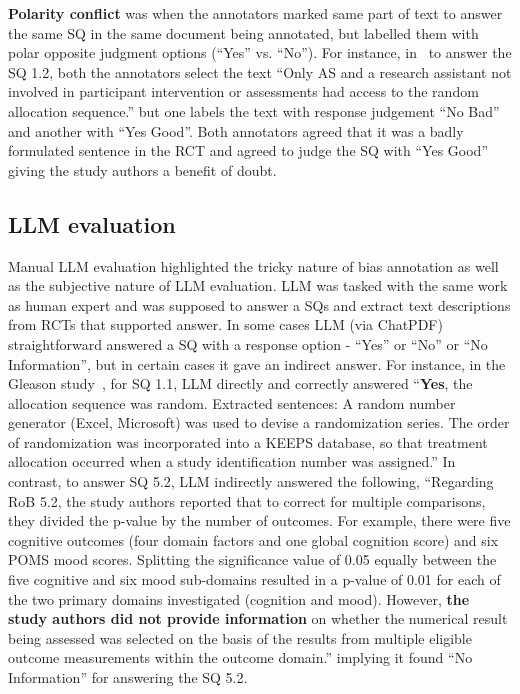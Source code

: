 \documentclass[sn-mathphys,Numbered]{sn-jnl}%
\theoremstyle{thmstyleone}%
\theoremstyle{thmstyletwo}%
\theoremstyle{thmstylethree}%
\begin{document}
\textbf{Polarity conflict} was when the annotators marked same part of text to answer the same SQ in the same document being annotated, but labelled them with polar opposite judgment options (``Yes'' vs. ``No'').
For instance, in~\cite{solomons2020intramuscular} to answer the SQ 1.2, both the annotators select the text ``Only AS and a research assistant not involved in participant intervention or assessments had access to the random allocation sequence.'' but one labels the text with response judgement ``No Bad'' and another with ``Yes Good''.
Both annotators agreed that it was a badly formulated sentence in the RCT and agreed to judge the SQ with ``Yes Good'' giving the study authors a benefit of doubt. 
%
%
%
\subsection{LLM evaluation}
\label{disc:llm}
%
Manual LLM evaluation highlighted the tricky nature of bias annotation as well as the subjective nature of LLM evaluation.
LLM was tasked with the same work as human expert and was supposed to answer a SQs and extract text descriptions from RCTs that supported answer.
In some cases LLM (via ChatPDF) straightforward answered a SQ with a response option - ``Yes'' or ``No'' or ``No Information'', but in certain cases it gave an indirect answer.
For instance, in the Gleason study~\cite{gleason2015effects}, for SQ 1.1, LLM directly and correctly answered ``\textbf{Yes}, the allocation sequence was random. Extracted sentences: A random number generator (Excel, Microsoft) was used to devise a randomization series. The order of randomization was incorporated into a KEEPS database, so that treatment allocation occurred when a study identification number was assigned.''
In contrast, to answer SQ 5.2, LLM indirectly answered the following, ``Regarding RoB 5.2, the study authors reported that to correct for multiple comparisons, they divided the p-value by the number of outcomes. For example, there were five cognitive outcomes (four domain factors and one global cognition score) and six POMS mood scores. Splitting the significance value of 0.05 equally between the five cognitive and six mood sub-domains resulted in a p-value of 0.01 for each of the two primary domains investigated (cognition and mood). However, \textbf{the study authors did not provide information} on whether the numerical result being assessed was selected on the basis of the results from multiple eligible outcome measurements within the outcome domain.'' implying it found ``No Information'' for answering the SQ 5.2.
\end{document}
